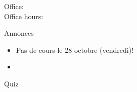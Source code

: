 \documentclass{beamer}
\subtitle[Comparatifs et superlatifs]{Les comparatifs et les superlatifs}
\begin{document}
  \begin{frame}
    \titlepage
    \tiny{Office: \\
          Office hours: }
  \end{frame}

  \begin{frame}{Annonces}
    \begin{itemize}
      \item Pas de cours le 28 octobre (vendredi)!
      \item[] 
    \end{itemize}
  \end{frame}

  \begin{frame}{}
    \begin{center}
      \Large Quiz
    \end{center}
  \end{frame}
\end{document}
